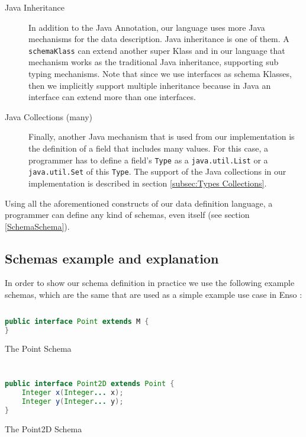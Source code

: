 \begin{description}
	\item [Java Inheritance] In addition to the Java Annotation, our language uses more Java mechanisms for the data description. 
	Java inheritance is one of them. 
	A \texttt{schemaKlass} can extend another super Klass and in our language that mechanism works as the traditional Java inheritance, supporting sub typing mechanisms.
	Note that since we use interfaces as schema Klasses, then we implicitly support multiple inheritance because in Java an interface can extend more than one interfaces.

	\item [Java Collections (many)] Finally, another Java mechanism that is used from our implementation is the definition of a field that includes many values.
	For this case, a programmer has to define a field's \texttt{Type} as a \texttt{java.util.List} or a \texttt{java.util.Set} of this \texttt{Type}. 
	The support of the Java collections in our implementation is described in section \ref{subsec:Types Collections}.

\end{description}

Using all the aforementioned constructs of our data definition language, a programmer can define any kind of schemas, even itself (see section \ref{SchemaSchema}).

\subsection{Schemas example and explanation}\label{Schemas example and explanation}
In order to show our schema definition in practice we use the following example schemas, which are the same that are used as a simple example use case in Enso \cite{loh2012managed}:

\begin{sourcecode}[H]
	\begin{lstlisting}[language=Java,escapechar=|]
public interface Point extends M {
}
	\end{lstlisting}
	\caption{The Point Schema}
	\label{lst:Point_Schema_implementation}
\end{sourcecode}

\begin{sourcecode}[H]
	\begin{lstlisting}[language=Java,escapechar=|]
public interface Point2D extends Point {
	Integer x(Integer... x);
	Integer y(Integer... y);
}
	\end{lstlisting}
	\caption{The Point2D Schema}
	\label{lst:Point2D_Schema_implementation}
\end{sourcecode}


